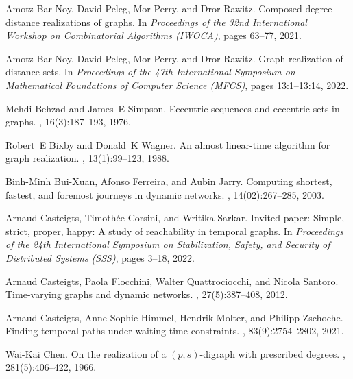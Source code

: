 \documentclass[a4paper,UKenglish,cleveref, autoref, thm-restate]{lipics-v2021}
\begin{document}
\begin{thebibliography}{10}
	Amotz Bar{-}Noy, David Peleg, Mor Perry, and Dror Rawitz.
	\newblock Composed degree-distance realizations of graphs.
	\newblock In {\em Proceedings of the 32nd International Workshop on
		Combinatorial Algorithms ({IWOCA})}, pages 63--77, 2021.
	
	Amotz Bar-Noy, David Peleg, Mor Perry, and Dror Rawitz.
	\newblock Graph realization of distance sets.
	\newblock In {\em Proceedings of the 47th International Symposium on
		Mathematical Foundations of Computer Science (MFCS)}, pages 13:1--13:14,
	2022.
	
	Mehdi Behzad and James~E Simpson.
	\newblock Eccentric sequences and eccentric sets in graphs.
	, 16(3):187--193, 1976.
	
	Robert~E Bixby and Donald~K Wagner.
	\newblock An almost linear-time algorithm for graph realization.
	, 13(1):99--123, 1988.
	
	Binh-Minh Bui-Xuan, Afonso Ferreira, and Aubin Jarry.
	\newblock Computing shortest, fastest, and foremost journeys in dynamic
	networks.
	,
	14(02):267--285, 2003.
	
	Arnaud Casteigts, Timoth{\'{e}}e Corsini, and Writika Sarkar.
	\newblock Invited paper: Simple, strict, proper, happy: A study of reachability
	in temporal graphs.
	\newblock In {\em Proceedings of the 24th International Symposium on
		Stabilization, Safety, and Security of Distributed Systems ({SSS})}, pages
	3--18, 2022.
	
	Arnaud Casteigts, Paola Flocchini, Walter Quattrociocchi, and Nicola Santoro.
	\newblock Time-varying graphs and dynamic networks.
	, 27(5):387--408, 2012.
	
	Arnaud Casteigts, Anne-Sophie Himmel, Hendrik Molter, and Philipp Zschoche.
	\newblock Finding temporal paths under waiting time constraints.
	, 83(9):2754--2802, 2021.
	
	Wai-Kai Chen.
	\newblock On the realization of a $(p, s)$-digraph with prescribed degrees.
	, 281(5):406--422, 1966.
	

\end{thebibliography}
\end{document}
